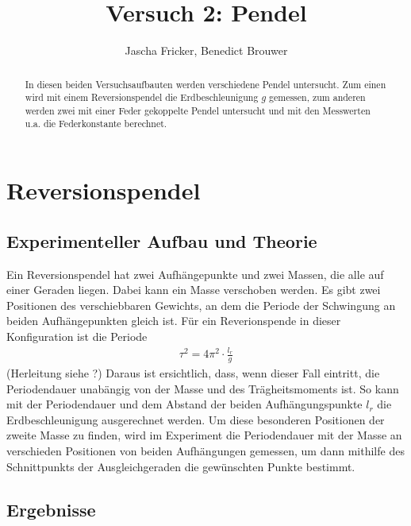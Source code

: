 \documentclass[11pt, a4paper]{article}
\title{Versuch 2: Pendel}
\author{Jascha Fricker, Benedict Brouwer}
\begin{document}
    \maketitle

    

    \begin{abstract}
        In diesen beiden Versuchsaufbauten werden verschiedene Pendel untersucht. Zum einen wird mit
        einem Reversionspendel die Erdbeschleunigung $g$ gemessen, zum anderen werden zwei mit einer Feder
        gekoppelte Pendel untersucht und mit den Messwerten u.a. die Federkonstante berechnet.
    \end{abstract}

    \tableofcontents

    \section{Reversionspendel}

    \subsection{Experimenteller Aufbau und Theorie}

    Ein Reversionspendel hat zwei Aufhängepunkte und zwei Massen, die alle auf einer Geraden liegen.
    Dabei kann ein Masse verschoben werden.
    Es gibt zwei Positionen des verschiebbaren Gewichts, an dem die Periode der Schwingung an beiden
    Aufhängepunkten gleich ist. Für ein Reverionspende in dieser Konfiguration ist die Periode
    \begin{align}
        \tau^2 = 4\pi^2 \cdot \frac{l_r}{g}
    \end{align}
    (Herleitung siehe ?) Daraus ist ersichtlich, dass, wenn dieser Fall eintritt, die Periodendauer unabängig von der Masse und des
    Trägheitsmoments ist. So kann mit der Periodendauer und dem Abstand der beiden Aufhängungspunkte $l_r$
    die Erdbeschleunigung ausgerechnet werden.
    Um diese besonderen Positionen der zweite Masse zu finden, wird im Experiment die Periodendauer
    mit der Masse an verschieden Positionen von beiden Aufhängungen gemessen,
    um dann mithilfe des Schnittpunkts der Ausgleichgeraden die gewünschten
    Punkte bestimmt.



    \subsection{Ergebnisse}
\end{document}
